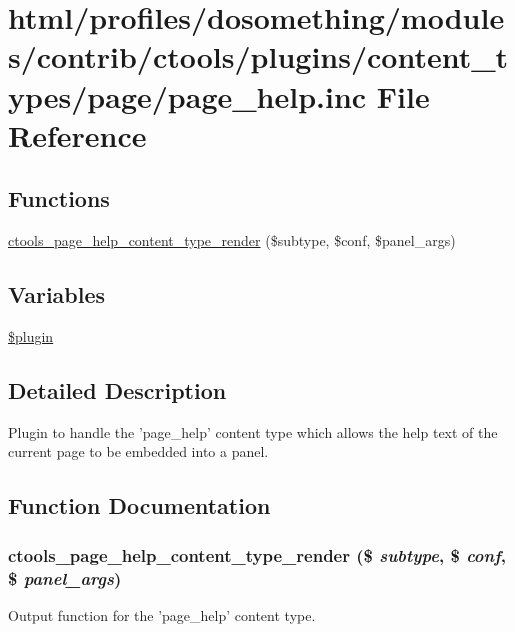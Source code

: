 \hypertarget{page__help_8inc}{
\section{html/profiles/dosomething/modules/contrib/ctools/plugins/content\_\-types/page/page\_\-help.inc File Reference}
\label{page__help_8inc}
}
\subsection*{Functions}
\begin{DoxyCompactItemize}
\item 
\hyperlink{page__help_8inc_a3c58cee7c7d5024a69095a4e1ea4ac1f}{ctools\_\-page\_\-help\_\-content\_\-type\_\-render} (\$subtype, \$conf, \$panel\_\-args)
\end{DoxyCompactItemize}
\subsection*{Variables}
\begin{DoxyCompactItemize}
\item 
\hyperlink{page__help_8inc_ada8a7130088351710bb02ed622d6bf65}{\$plugin}
\end{DoxyCompactItemize}


\subsection{Detailed Description}
Plugin to handle the 'page\_\-help' content type which allows the help text of the current page to be embedded into a panel. 

\subsection{Function Documentation}
\hypertarget{page__help_8inc_a3c58cee7c7d5024a69095a4e1ea4ac1f}{
\subsubsection[{ctools\_\-page\_\-help\_\-content\_\-type\_\-render}]{\setlength{\rightskip}{0pt plus 5cm}ctools\_\-page\_\-help\_\-content\_\-type\_\-render (\$ {\em subtype}, \/  \$ {\em conf}, \/  \$ {\em panel\_\-args})}}
\label{page__help_8inc_a3c58cee7c7d5024a69095a4e1ea4ac1f}
Output function for the 'page\_\-help' content type.

